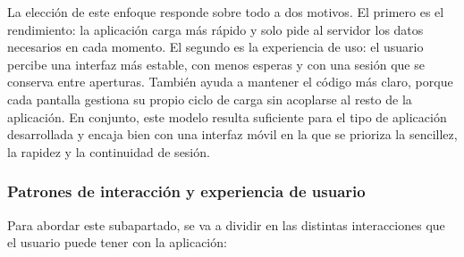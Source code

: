 La elección de este enfoque responde sobre todo a dos motivos. El primero es el rendimiento: la aplicación carga más rápido y solo pide al servidor los datos necesarios en cada momento. El 
segundo es la experiencia de uso: el usuario percibe una interfaz más estable, con menos esperas y con una sesión que se conserva entre aperturas. También ayuda a mantener el código más claro, porque cada pantalla gestiona su propio 
ciclo de carga sin acoplarse al resto de la aplicación. En conjunto, este modelo resulta suficiente para el tipo de aplicación desarrollada y encaja bien con una interfaz móvil en la que se prioriza la sencillez, la rapidez y la 
continuidad de sesión.

\subsubsection{Patrones de interacción y experiencia de usuario}

Para abordar este subapartado, se va a dividir en las distintas interacciones que el usuario puede tener con la aplicación:

